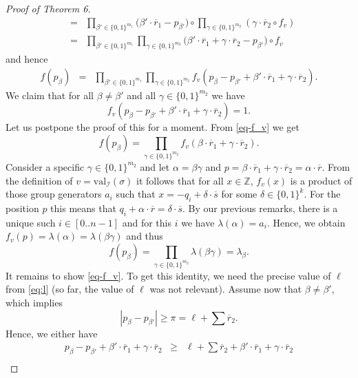 \documentclass[10pt,a4paper]{article}
\newcommand{\Z}{\ensuremath{\mathbb Z}}
\newcommand{\cointerval}[2]{[{#1}..{#2}-1]}
\newcommand{\val}{\mathrm{val}}
\begin{document}
\begin{proof}[Proof of Theorem 6]
\begin{eqnarray*}
& = & \prod_{\beta' \in \{0,1\}^{m_1}}   \big(\beta' \cdot \overline{r}_1 - p_{\beta'} \big) \circ \prod_{\gamma \in \{0,1\}^{m_2}} ( \gamma \cdot \overline{r}_2 \circ f_v)   \\
& = & \prod_{\beta' \in \{0,1\}^{m_1}}  \prod_{\gamma \in \{0,1\}^{m_2}}   \big(\beta' \cdot \overline{r}_1 + \gamma \cdot \overline{r}_2 - p_{\beta'} \big) \circ f_v
\end{eqnarray*}
and hence
\begin{eqnarray*}
f(p_\beta) 
&=& \prod_{\beta' \in \{0,1\}^{m_1}}  \prod_{\gamma \in \{0,1\}^{m_2}} f_v(p_{\beta} - p_{\beta'} + \beta' \cdot \overline{r}_1 + \gamma \cdot \overline{r}_2) .
\end{eqnarray*}
We claim that for all $\beta \neq \beta'$ and all $\gamma\in \{0,1\}^{m_2}$ we have
\begin{equation} \label{eq-f_v}
f_v(p_{\beta} - p_{\beta'} + \beta' \cdot \overline{r}_1 + \gamma \cdot \overline{r}_2) = 1 .
\end{equation}
Let us postpone the proof of this for a moment. From \eqref{eq-f_v} we get
\[
f(p_\beta) = \prod_{\gamma \in \{0,1\}^{m_2}} f_v(\beta \cdot \overline{r}_1 + \gamma \cdot \overline{r}_2) .
\]
Consider a specific $\gamma \in \{0,1\}^{m_2}$ and let $\alpha = \beta \gamma$ and
$p = \beta \cdot \overline{r}_1 + \gamma \cdot \overline{r}_2 = \alpha \cdot \overline{r}$.
From the definition of $v = \val_{\mathcal{I}}(\sigma)$ it follows that for all $x \in \Z$, $f_v(x)$ is a product
of those group generators $a_i$ such that $x =  -q_i + \delta \cdot \overline{s}$ for some $\delta \in \{0,1\}^k$.
For the position $p$ this means that $q_i + \alpha \cdot \overline{r} = \delta \cdot \overline{s}$. By our previous remarks,
there is a unique such $i \in\cointerval{0}{n}$ and for this $i$ we have $\lambda(\alpha) = a_i$.
Hence, we obtain $f_v(p) = \lambda(\alpha)= \lambda(\beta\gamma)$ and thus
\[
f(p_\beta) = \prod_{\gamma \in \{0,1\}^{m_2}} \lambda(\beta\gamma) = \lambda_\beta .
\]
It remains to show \eqref{eq-f_v}. To get this identity, we need the precise value of $\ell$ from \eqref{eq:l}
(so far, the  value of $\ell$ was not relevant).
Assume now that $\beta \neq \beta'$, which implies
\[
|p_{\beta} - p_{\beta'}| \geq \pi =  \ell +  \sum \overline{r}_2 .
\]
Hence, we  either have 
\begin{eqnarray*}
p_{\beta} - p_{\beta'} +\beta' \cdot \overline{r}_1 + \gamma \cdot \overline{r}_2 & \geq & \ell +  \sum \overline{r}_2 + \beta' \cdot \overline{r}_1 + \gamma \cdot \overline{r}_2 \\

\end{eqnarray*}
\end{proof}
\end{document}
